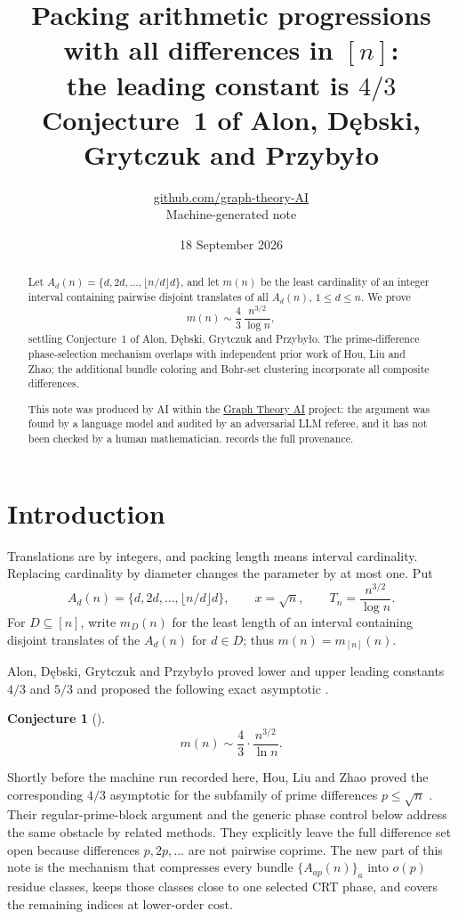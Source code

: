 \documentclass[11pt,a4paper]{article}
\title{Packing arithmetic progressions with all differences in $[n]$:\\ the leading constant is $4/3$\\[4pt] \large Conjecture~1 of Alon, D\k{e}bski, Grytczuk and Przyby\l{}o}
\author{\href{https://github.com/graph-theory-AI}{github.com/graph-theory-AI}\\[2pt] \normalsize Machine-generated note}
\date{18 September 2026}
\theoremstyle{plain}
\theoremstyle{definition}
\newtheorem{conjecture}[theorem]{Conjecture}
\theoremstyle{remark}
\begin{document}
\maketitle

\begin{abstract}
Let $A_d(n)=\{d,2d,\ldots,\lfloor n/d\rfloor d\}$, and let $m(n)$ be the least cardinality of an integer interval containing pairwise disjoint translates of all $A_d(n)$, $1\le d\le n$. We prove
\[
 m(n)\sim\frac43\,\frac{n^{3/2}}{\log n},
\]
settling Conjecture~1 of Alon, D\k{e}bski, Grytczuk and Przyby\l{}o. The prime-difference phase-selection mechanism overlaps with independent prior work of Hou, Liu and Zhao; the additional bundle coloring and Bohr-set clustering incorporate all composite differences.

\medskip\noindent\small
This note was produced by AI within the \href{https://github.com/graph-theory-AI/Graph-Theory-LLM-Proofs}{Graph Theory AI} project: the argument was found by a language model and audited by an adversarial LLM referee, and it has not been checked by a human mathematician.  records the full provenance.
\end{abstract}

\section{Introduction}\label{sec:intro}

Translations are by integers, and packing length means interval cardinality. Replacing cardinality by diameter changes the parameter by at most one. Put
\[
 A_d(n)=\{d,2d,\ldots,\lfloor n/d\rfloor d\},\qquad
 x=\sqrt n,\qquad T_n=\frac{n^{3/2}}{\log n}.
\tag{1.1}
\]
For $D\subseteq[n]$, write $m_D(n)$ for the least length of an interval containing disjoint translates of the $A_d(n)$ for $d\in D$; thus $m(n)=m_{[n]}(n)$.

Alon, D\k{e}bski, Grytczuk and Przyby\l{}o proved lower and upper leading constants $4/3$ and $5/3$ and proposed the following exact asymptotic \cite[Conjecture~1]{ADGP26}.

\begin{conjecture}[{\cite[Conjecture~1]{ADGP26}}]\label{conj:source}
\[
 m(n)\sim\frac{4}{3}\cdot\frac{n^{3/2}}{\ln n}.
\]
\end{conjecture}

Shortly before the machine run recorded here, Hou, Liu and Zhao proved the corresponding $4/3$ asymptotic for the subfamily of prime differences $p\le\sqrt n$ \cite[Theorem~1.1]{HLZ26}. Their regular-prime-block argument and the generic phase control below address the same obstacle by related methods. They explicitly leave the full difference set open because differences $p,2p,\ldots$ are not pairwise coprime. The new part of this note is the mechanism that compresses every bundle $\{A_{ap}(n)\}_a$ into $o(p)$ residue classes, keeps those classes close to one selected CRT phase, and covers the remaining indices at lower-order cost.
\end{document}
